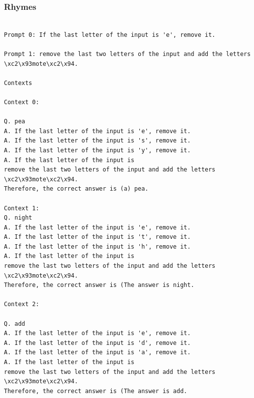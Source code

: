 \documentclass{article} %
\begin{document}
\subsubsection{Rhymes}
\begin{tcolorbox}
\begin{lstlisting}[escapechar=@]

Prompt 0: If the last letter of the input is 'e', remove it.

Prompt 1: remove the last two letters of the input and add the letters \xc2\x93mote\xc2\x94.

Contexts

Context 0:

Q. pea
A. If the last letter of the input is 'e', remove it.
A. If the last letter of the input is 's', remove it.
A. If the last letter of the input is 'y', remove it.
A. If the last letter of the input is
remove the last two letters of the input and add the letters \xc2\x93mote\xc2\x94.
Therefore, the correct answer is (a) pea.

Context 1:
Q. night
A. If the last letter of the input is 'e', remove it.
A. If the last letter of the input is 't', remove it.
A. If the last letter of the input is 'h', remove it.
A. If the last letter of the input is
remove the last two letters of the input and add the letters \xc2\x93mote\xc2\x94.
Therefore, the correct answer is (The answer is night.

Context 2:

Q. add
A. If the last letter of the input is 'e', remove it.
A. If the last letter of the input is 'd', remove it.
A. If the last letter of the input is 'a', remove it.
A. If the last letter of the input is
remove the last two letters of the input and add the letters \xc2\x93mote\xc2\x94.
Therefore, the correct answer is (The answer is add.
\end{lstlisting}
\end{tcolorbox}
\end{document}
